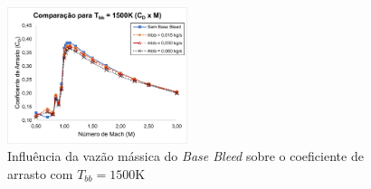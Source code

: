 \begin{figure}[!ht]
	\centering
	\includegraphics[width=0.47\textwidth]{cd-combasebleed-1500K-2pol.png}
	\caption{Influência da vazão mássica do \textit{Base Bleed} sobre o coeficiente de arrasto com $T_{bb} = 1500 \unit{\kelvin}$}
	\label{fig:comparacao-basebleed-vazao}
\end{figure}

